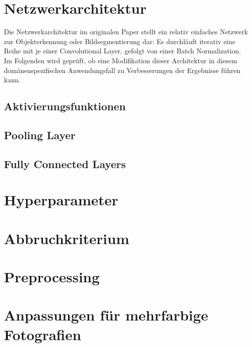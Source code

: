 \section{Netzwerkarchitektur}
\label{sec:networkarch}

Die Netzwerkarchitektur im originalen Paper stellt ein relativ einfaches Netzwerk zur Objekterkennung oder Bildsegmentierung dar: Es durchläuft iterativ eine Reihe mit je einer Convolutional Layer, gefolgt von einer Batch Normalization. Im Folgenden wird geprüft, ob eine Modifikation dieser Architektur in diesem domänenspezifischen Anwendungsfall zu Verbesserungen der Ergebnisse führen kann.

\subsection{Aktivierungsfunktionen}
\label{ssec:arch_activation}

\subsection{Pooling Layer}
\label{ssec:arch_pooling}

\subsection{Fully Connected Layers}
\label{ssec:arch_fully}

\section{Hyperparameter}
\label{sec:hyperparameter}

\section{Abbruchkriterium}
\label{sec:stoppingcriteria}

\section{Preprocessing}
\label{sec:preprocessing}

\section{Anpassungen für mehrfarbige Fotografien}
\label{sec:referenceimages}